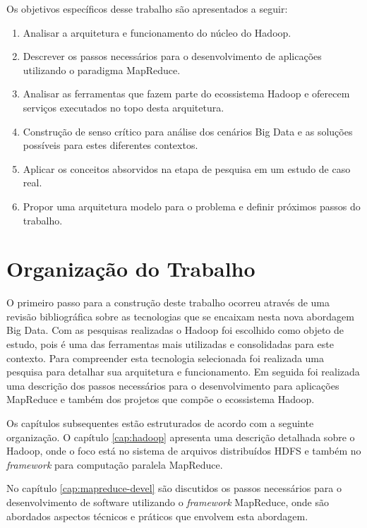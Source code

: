 Os objetivos específicos desse trabalho são apresentados a seguir:
 
\begin{enumerate}
  \item Analisar a arquitetura e funcionamento do núcleo do Hadoop.
  \item Descrever os passos necessários para o desenvolvimento de aplicações utilizando o paradigma MapReduce.
  \item Analisar as ferramentas que fazem parte do ecossistema Hadoop e oferecem serviços executados no topo desta arquitetura.
  \item Construção de senso crítico para análise dos cenários Big Data e as soluções possíveis para estes diferentes contextos.
  \item Aplicar os conceitos absorvidos na etapa de pesquisa em um estudo de caso real.
  \item Propor uma arquitetura modelo para o problema e definir próximos passos do trabalho.
\end{enumerate}
 
 
\section{Organização do Trabalho}
 
O primeiro passo para a construção deste trabalho ocorreu através de uma revisão bibliográfica sobre as tecnologias que se encaixam nesta nova abordagem Big Data. Com as pesquisas realizadas o Hadoop foi escolhido como objeto de estudo, pois é uma das ferramentas mais utilizadas e consolidadas para este contexto. Para compreender esta tecnologia selecionada foi realizada uma pesquisa para detalhar sua arquitetura e funcionamento. Em seguida foi realizada uma descrição dos passos necessários para o desenvolvimento para aplicações MapReduce e também dos projetos que compõe o ecossistema Hadoop.

Os capítulos subsequentes estão estruturados de acordo com a seguinte organização. O capítulo \ref{cap:hadoop} apresenta uma descrição detalhada sobre o Hadoop, onde o foco está no sistema de arquivos distribuídos HDFS e também no \textit{framework} para computação paralela MapReduce. 

No capítulo \ref{cap:mapreduce-devel} são discutidos os passos necessários para o desenvolvimento de software utilizando o \textit{framework} MapReduce, onde são abordados aspectos técnicos e práticos que envolvem esta abordagem.

